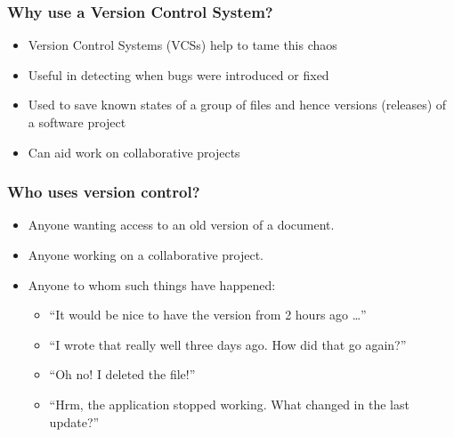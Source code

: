 \documentclass{git_course}
\begin{document}
\begin{frame}
\frametitle{Why use a Version Control System?}
\begin{itemize}
    \item Version Control Systems (VCSs) help to tame this chaos
    \item Useful in detecting when bugs were introduced or fixed
    \item Used to save known states of a group of files and hence versions
        (releases) of a software project
    \item Can aid work on collaborative projects
\end{itemize}
\end{frame}

\begin{frame}
\frametitle{Who uses version control?}
\begin{itemize}
    \item Anyone wanting access to an old version of a document.
    \item Anyone working on a collaborative project.
    \item Anyone to whom such things have happened:
        \begin{itemize}
            \item ``It would be nice to have the version from 2 hours ago \ldots''
            \item ``I wrote that really well three days ago.  How did that
                go again?''
            \item ``Oh no!  I deleted the file!''
            \item ``Hrm, the application stopped working.  What changed in the
                last update?''
        \end{itemize}
\end{itemize}
\end{frame}
\end{document}
